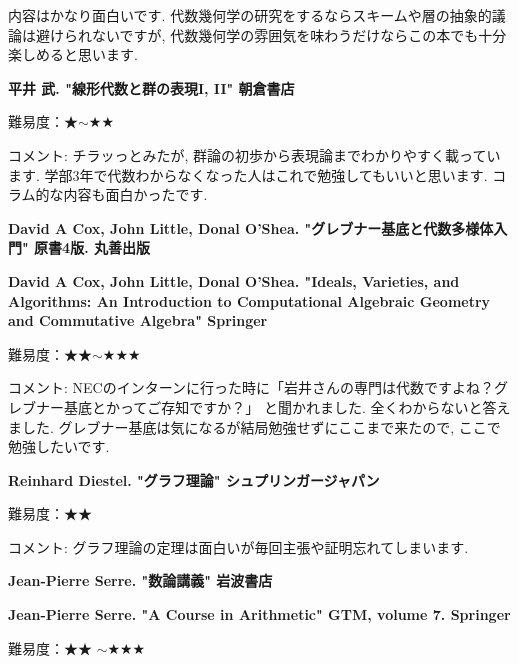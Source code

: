 内容はかなり面白いです. 代数幾何学の研究をするならスキームや層の抽象的議論は避けられないですが, 代数幾何学の雰囲気を味わうだけならこの本でも十分楽しめると思います. 
\vspace{8pt}

\textbf{平井 武. "線形代数と群の表現I, II" 朝倉書店}  　\vspace{-6pt} 


難易度：★$\sim$★★ 　 　\vspace{-6pt} 

コメント: チラッっとみたが, 群論の初歩から表現論までわかりやすく載っています. 学部3年で代数わからなくなった人はこれで勉強してもいいと思います. コラム的な内容も面白かったです. 

\vspace{8pt}




\textbf{David A Cox, John Little, Donal O'Shea. "グレブナー基底と代数多様体入門" 原書4版. 丸善出版}  　\vspace{-6pt} 

\textbf{David A Cox, John Little, Donal O'Shea. "Ideals, Varieties, and Algorithms: An Introduction to Computational Algebraic Geometry and Commutative Algebra" Springer}  　\vspace{-6pt} 

難易度：★★$\sim$★★★\vspace{-6pt} 

コメント: NECのインターンに行った時に「岩井さんの専門は代数ですよね？グレブナー基底とかってご存知ですか？」
と聞かれました. 全くわからないと答えました. 
グレブナー基底は気になるが結局勉強せずにここまで来たので, ここで勉強したいです. 
\vspace{8pt}

\textbf{Reinhard Diestel. "グラフ理論" シュプリンガージャパン}  　\vspace{-6pt} 

難易度：★★\vspace{-6pt} 

コメント: グラフ理論の定理は面白いが毎回主張や証明忘れてしまいます. 
\vspace{8pt}

\textbf{Jean-Pierre Serre. "数論講義" 岩波書店}  　\vspace{-6pt} 

\textbf{Jean-Pierre Serre. "A Course in Arithmetic" GTM, volume 7. Springer}  　\vspace{-6pt} 

難易度：★★ $\sim$★★★\vspace{-6pt} 

